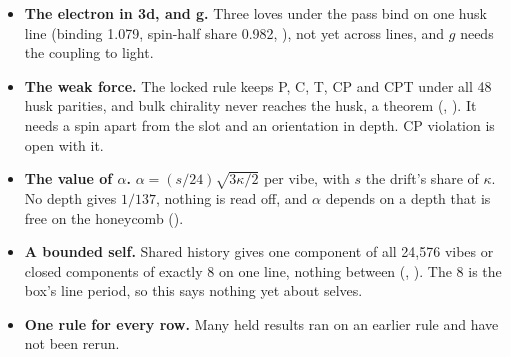 \begin{itemize}
\item \textbf{The electron in 3d, and g.} Three loves under the pass bind on one husk line (binding 1.079, spin-half
share 0.982, ), not yet across lines, and $g$ needs the coupling to light.
\item \textbf{The weak force.} The locked rule keeps P, C, T, CP and CPT under all 48 husk parities, and bulk chirality
never reaches the husk, a theorem (, ). It needs a spin apart from the slot and an
orientation in depth. CP violation is open with it.
\item \textbf{The value of $\alpha$.} $\alpha = (s/24)\sqrt{3\kappa/2}$ per vibe, with $s$ the drift's share of
$\kappa$. No depth gives $1/137$, nothing is read off, and $\alpha$ depends on a depth that is free on the
honeycomb ().
\item \textbf{A bounded self.} Shared history gives one component of all 24,576 vibes or closed components of exactly
8 on one line, nothing between (, ). The 8 is the box's line period, so this says
nothing yet about selves.
\item \textbf{One rule for every row.} Many held results ran on an earlier rule and have not been rerun.
\end{itemize}
